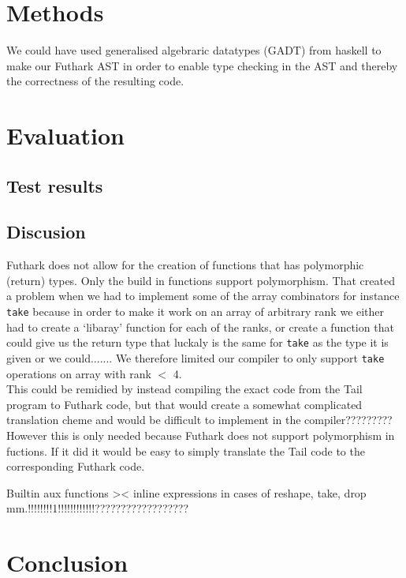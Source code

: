 \documentclass[11pt]{article}
\begin{document}
\section{Methods}
We could have used generalised algebraric datatypes (GADT) from haskell to make our Futhark AST in order to enable type checking in the AST and thereby the correctness of the resulting code. 

\section{Evaluation}
\subsection{Test results}
\subsection{Discusion}
Futhark does not allow for the creation of functions that has polymorphic (return) types. Only the build in functions support polymorphism. That created a problem when we had to implement some of the array combinators for instance  \verb|take| because in order to make it work on an array of arbitrary rank we either had to create a `libaray' function for each of the ranks, or create a function that could give us the return type that luckaly is the same for \verb|take| as the type it is given or we could....... 
We therefore limited our compiler to only support \verb|take| operations on array with rank \(< \) 4. \\ %

This could be remidied by instead compiling the exact code from the Tail program to Futhark code, but that would create a somewhat complicated translation cheme and would be difficult to implement in the compiler????????? %
However this is only needed because Futhark does not support polymorphism in fuctions. If it did it would be easy to simply translate the Tail code to the corresponding Futhark code.

Builtin aux functions >< inline expressions in cases of reshape, take, drop mm.!!!!!!!!1!!!!!!!!!!!!??????????????????

\section{Conclusion}

\end{document}

